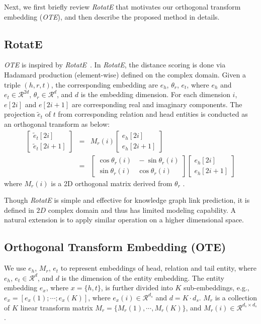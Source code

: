 \documentclass[11pt,a4paper]{article}
\begin{document}
Next, we first briefly review {\it RotatE} that motivates our orthogonal transform embedding ({\em OTE}), and then describe the proposed method in details.

\subsection{RotatE}
{\em OTE} is inspired by {\it RotatE}~\cite{Sun2019RotatEKG}.
In {\it RotatE}, the distance scoring is done via Hadamard production (element-wise) defined on the complex domain. Given a triple $(h,r,t)$, the corresponding embedding are $e_h$, $\theta_r$, $e_t$, where $e_h$ and $e_t \in \mathcal{R}^{2d}$, $\theta_r \in \mathcal{R}^{d}$,  and $d$ is the embedding dimension.  For each dimension $i$, $e[2i]$ and $e[2i+1]$ are corresponding real and imaginary components. The projection $\tilde{e}_t$ of $t$ from corresponding relation and head entities is conducted as an orthogonal transform as below:
\begin{eqnarray}
  \begin{bmatrix}\tilde{e}_t[2i]\\ \tilde{e}_t[2i\!+\!1]\end{bmatrix} \!\!\!\!&=&\!\!\! M_r(i)\begin{bmatrix}e_h[2i]\\ e_h[2i\!+\!1]\end{bmatrix} \nonumber\\ 
  \!\!\!\!&=&\!\!\! \begin{bmatrix}
    \cos{\theta_r(i)} &\! -\sin{\theta_r(i)} \\
    \sin{\theta_r(i)} &\! \cos{\theta_r(i)}
    \end{bmatrix}\begin{bmatrix}e_h[2i]\\ e_h[2i\!+\!1]\end{bmatrix} \nonumber
\end{eqnarray}
where $M_r(i)$ is a 2D orthogonal matrix derived from $\theta_r$ .

Though {\it RotatE} is simple and effective for knowledge graph link prediction, it is defined in $2D$ complex domain and thus has limited modeling capability. 
A natural extension is to apply similar operation on a higher dimensional space.



\subsection{Orthogonal Transform Embedding (OTE)} \label{sec:ote}
We use $e_h$, $M_r$, $e_t$ to represent embeddings of head, relation and tail entity, where $e_h$, $e_t \in \mathcal{R}^d$,  and $d$ is the dimension of the entity embedding. The entity embedding $e_{x}$, where $x= \{h, t\}$, is further divided into $K$ sub-embeddings, e.g., $e_{x} = [e_{x}(1);\cdots;e_{x}(K)]$, where $e_{x}(i)\in\mathcal{R}^{d_s}$ and $d=K\cdot d_s$. $M_r$ is a collection of $K$ linear transform matrix $M_r = \{ M_r(1),\cdots,M_r(K)\}$, and $M_r(i)\in\mathcal{R}^{d_s\times d_s}$. 
\end{document}
